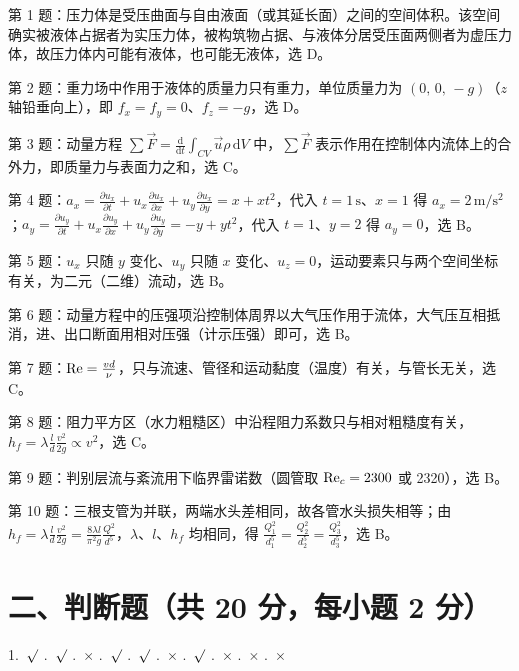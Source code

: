 \begin{tishi}
第 1 题：压力体是受压曲面与自由液面（或其延长面）之间的空间体积。该空间确实被液体占据者为实压力体，被构筑物占据、与液体分居受压面两侧者为虚压力体，故压力体内可能有液体，也可能无液体，选 D。

第 2 题：重力场中作用于液体的质量力只有重力，单位质量力为 $(0,\,0,\,-g)$（$z$ 轴铅垂向上），即 $f_x=f_y=0$、$f_z=-g$，选 D。

第 3 题：动量方程 $\sum\vec F=\frac{\mathrm{d}}{\mathrm{d}t}\int_{CV}\vec u\rho\,\mathrm{d}V$ 中，$\sum\vec F$ 表示作用在控制体内流体上的合外力，即质量力与表面力之和，选 C。

第 4 题：$a_x=\frac{\partial u_x}{\partial t}+u_x\frac{\partial u_x}{\partial x}+u_y\frac{\partial u_x}{\partial y}=x+xt^{2}$，代入 $t=1\,\mathrm{s}$、$x=1$ 得 $a_x=2\,\mathrm{m/s^2}$；$a_y=\frac{\partial u_y}{\partial t}+u_x\frac{\partial u_y}{\partial x}+u_y\frac{\partial u_y}{\partial y}=-y+yt^{2}$，代入 $t=1$、$y=2$ 得 $a_y=0$，选 B。

第 5 题：$u_x$ 只随 $y$ 变化、$u_y$ 只随 $x$ 变化、$u_z=0$，运动要素只与两个空间坐标有关，为二元（二维）流动，选 B。

第 6 题：动量方程中的压强项沿控制体周界以大气压作用于流体，大气压互相抵消，进、出口断面用相对压强（计示压强）即可，选 B。

第 7 题：$\mathrm{Re}=\frac{vd}{\nu}$，只与流速、管径和运动黏度（温度）有关，与管长无关，选 C。

第 8 题：阻力平方区（水力粗糙区）中沿程阻力系数只与相对粗糙度有关，$h_f=\lambda\frac{l}{d}\frac{v^2}{2g}\propto v^{2}$，选 C。

第 9 题：判别层流与紊流用下临界雷诺数（圆管取 $\mathrm{Re}_c=2300$ 或 2320），选 B。

第 10 题：三根支管为并联，两端水头差相同，故各管水头损失相等；由 $h_f=\lambda\frac{l}{d}\frac{v^2}{2g}=\frac{8\lambda l}{\pi^2g}\frac{Q^2}{d^{5}}$，$\lambda$、$l$、$h_f$ 均相同，得 $\frac{Q_1^2}{d_1^{5}}=\frac{Q_2^2}{d_2^{5}}=\frac{Q_3^2}{d_3^{5}}$，选 B。
\end{tishi}

\section{二、判断题（共 20 分，每小题 2 分）}

\begin{center}
1.~$\surd$ .~$\surd$ .~$\times$ .~$\surd$ .~$\surd$ .~$\times$ .~$\surd$ .~$\times$ .~$\times$ .~$\times$
\end{center}

